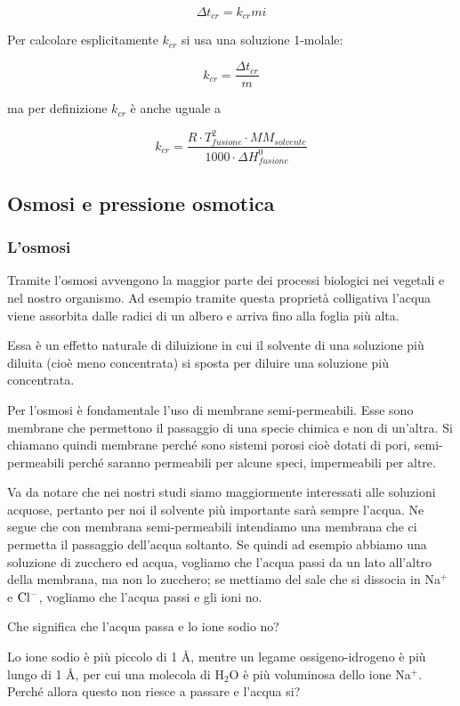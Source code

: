 $$\Delta t_{cr}=k_{cr} m i$$

Per calcolare esplicitamente $k_{cr}$ si usa una soluzione 1-molale:

$$k_{cr} = \frac{\Delta t_{cr}}{m}$$

ma per definizione $k_{cr}$ è anche uguale a

$$k_{cr}=\frac{R \cdot T_{fusione}^2 \cdot MM_{solvente}}{1000 \cdot \Delta H^0_{fusione}}$$

\subsection{Osmosi e pressione osmotica}
\subsubsection{L'osmosi}
Tramite l'osmosi avvengono la maggior parte dei processi biologici nei vegetali e nel nostro organismo. Ad esempio tramite questa proprietà colligativa l'acqua viene assorbita dalle radici di un albero e arriva fino alla foglia più alta.

Essa è un effetto naturale di diluizione in cui il solvente di una soluzione più diluita (cioè meno concentrata) si sposta per diluire una soluzione più concentrata.

Per l'osmosi è fondamentale l'uso di membrane semi-permeabili. Esse sono membrane che permettono il passaggio di una specie chimica e non di un'altra. Si chiamano quindi membrane perché sono sistemi porosi cioè dotati di pori, semi-permeabili perché saranno permeabili per alcune speci, impermeabili per altre.

Va da notare che nei nostri studi siamo maggiormente interessati alle soluzioni acquose, pertanto per noi il solvente più importante sarà sempre l'acqua. Ne segue che con membrana semi-permeabili intendiamo una membrana che ci permetta il passaggio dell'acqua soltanto. Se quindi ad esempio abbiamo una soluzione di zucchero ed acqua, vogliamo che l'acqua passi da un lato all'altro della membrana, ma non lo zucchero; se mettiamo del sale che si dissocia in Na$^+$ e $\rm Cl^-$, vogliamo che l'acqua passi e gli ioni no.

Che significa che l'acqua passa e lo ione sodio no?

Lo ione sodio è più piccolo di 1 Å, mentre un legame ossigeno-idrogeno è più lungo di 1 Å, per cui una molecola di H$_2$O è più voluminosa dello ione Na$^+$. Perché allora questo non riesce a passare e l'acqua si?

